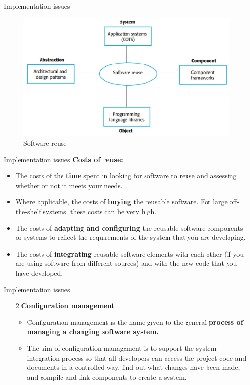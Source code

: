 \documentclass{beamer}
\begin{document}
\begin{frame}{Implementation issues}
	\begin{figure}
	\includegraphics[scale=.45]{img/m3_13}
	\caption{Software 
		reuse
	}
\end{figure}

\end{frame}
\begin{frame}{Implementation issues}
\textbf{Costs of reuse:}
\begin{itemize}
	\item The costs of the\textbf{ time }spent in looking for software to reuse and assessing whether or not it meets your needs.
	\item Where applicable, the costs of\textbf{ buying }the reusable software. For large off-the-shelf systems, these costs can be very high.
	\item The costs of \textbf{adapting and configuring} the reusable software components or systems to reflect the requirements of the system that you are developing.
	\item The costs of\textbf{ integrating} reusable software elements with each other (if you are using software from different sources) and with the new code that you have developed.
\end{itemize}
\end{frame}
\begin{frame}{Implementation issues}
\begin{itemize}
	\item[2] \textbf{Configuration management}
	\begin{itemize}
		\item Configuration management is the name given to the general \textbf{process of managing a 
			changing software system. }
		\item The aim of configuration management is to support the system integration process so 
		that all developers can access the project code and documents in a controlled way, find 
		out what changes have been made, and compile and link components to create a system.
	\end{itemize} 
\end{itemize}
\end{frame}
\end{document}

